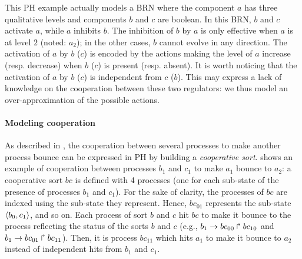 \begin{example}
This PH example actually models a BRN where the component $a$ has three qualitative
levels and components $b$ and $c$ are boolean.
In this BRN, $b$ and $c$ activate $a$, while $a$ inhibits $b$.
The inhibition of $b$ by $a$ is only effective when $a$ is at level $2$ (noted: $a_2$);
in the other cases, $b$ cannot evolve in any direction.
The activation of $a$ by $b$ ($c$) is encoded by the actions making the level of $a$ increase (resp.
decrease) when $b$ ($c$) is present (resp. absent).
It is worth noticing that the activation of $a$ by $b$ ($c$) is independent from $c$ ($b$).
This may express a lack of knowledge on the cooperation between these two regulators:
we thus model an over-approximation of the possible actions.
\end{example}

\paragraph{Modeling cooperation}
As described in \cite{PMR10-TCSB}, the cooperation between several processes to make another process bounce can be
expressed in PH by building a \emph{cooperative sort}.
 shows an example of cooperation between processes $b_1$ and $c_1$ to
make $a_1$ bounce to $a_2$:
a cooperative sort $bc$ is defined with 4 processes (one for each sub-state of the presence of
processes $b_1$ and $c_1$).
For the sake of clarity, the processes of $bc$ are indexed using the sub-state they represent.
Hence, $bc_{01}$ represents the sub-state $\langle b_0,c_1 \rangle$, and so on.
Each process of sort $b$ and $c$ hit $bc$ to make it bounce to the process reflecting the status of the sorts $b$
and $c$ (e.g., $b_1\rightarrow bc_{00}\Rsh bc_{10}$ and $b_1\rightarrow bc_{01}\Rsh bc_{11}$).
Then, it is process $bc_{11}$ which hits $a_1$ to make it bounce to $a_2$ instead of
independent hits from $b_1$ and $c_1$.

